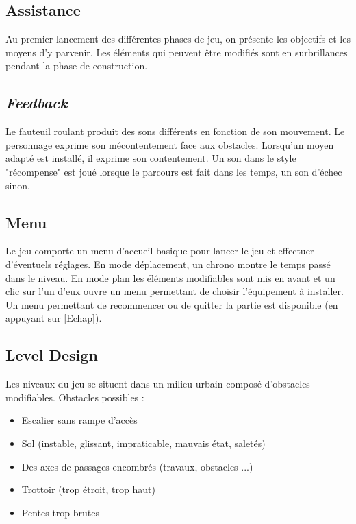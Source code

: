 \documentclass[a4paper,11pt]{article}
\begin{document}
\subsection*{Assistance}

Au premier lancement des différentes phases de jeu, on présente les objectifs et les moyens d’y parvenir.
Les éléments qui peuvent être modifiés sont en surbrillances pendant la phase de construction.

\subsection*{\textit{Feedback}}
Le fauteuil roulant produit des sons différents en fonction de son mouvement. Le personnage exprime son mécontentement face aux obstacles. Lorsqu’un moyen adapté est installé, il exprime son contentement. Un son dans le style "récompense" est joué lorsque le parcours est fait dans les temps, un son d’échec sinon.

\subsection*{Menu}

Le jeu comporte un menu d’accueil basique pour lancer le jeu et effectuer d’éventuels réglages. En mode déplacement, un chrono montre le temps passé dans le niveau. En mode plan les éléments modifiables sont mis en avant et un clic sur l’un d’eux ouvre un menu permettant de choisir l’équipement à installer. Un menu permettant de recommencer ou de quitter la partie est disponible (en appuyant sur [Echap]).

\subsection*{Level Design}

Les niveaux du jeu se situent dans un milieu urbain composé d’obstacles modifiables.
Obstacles possibles :
\begin{itemize}
\item Escalier sans rampe d’accès
\item Sol (instable, glissant, impraticable, mauvais état, saletés)
\item Des axes de passages encombrés (travaux, obstacles ...)
\item Trottoir (trop étroit, trop haut)
\item Pentes trop brutes
\end{itemize}
\end{document}
